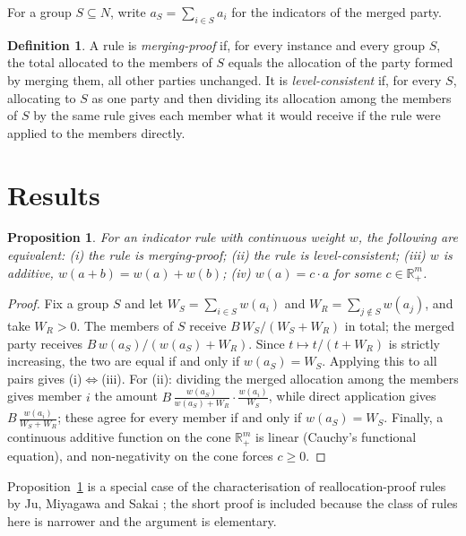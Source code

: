 \documentclass[11pt]{article}
\newtheorem{proposition}{Proposition}
\theoremstyle{definition}
\newtheorem{definition}{Definition}
\theoremstyle{remark}
\begin{document}
For a group $S\subseteq N$, write $a_S=\sum_{i\in S}a_i$ for the indicators of the merged party.

\begin{definition}
A rule is \emph{merging-proof} if, for every instance and every group $S$, the total allocated to the members of $S$ equals the allocation of the party formed by merging them, all other parties unchanged. It is \emph{level-consistent} if, for every $S$, allocating to $S$ as one party and then dividing its allocation among the members of $S$ by the same rule gives each member what it would receive if the rule were applied to the members directly.
\end{definition}

\section{Results}\label{sec:results}

\begin{proposition}\label{prop:linear}
For an indicator rule with continuous weight $w$, the following are equivalent: (i) the rule is merging-proof; (ii) the rule is level-consistent; (iii) $w$ is additive, $w(a+b)=w(a)+w(b)$; (iv) $w(a)=c\cdot a$ for some $c\in\mathbb{R}^m_{+}$.
\end{proposition}

\begin{proof}
Fix a group $S$ and let $W_S=\sum_{i\in S}w(a_i)$ and $W_R=\sum_{j\notin S}w(a_j)$, and take $W_R>0$. The members of $S$ receive $B\,W_S/(W_S+W_R)$ in total; the merged party receives $B\,w(a_S)/(w(a_S)+W_R)$. Since $t\mapsto t/(t+W_R)$ is strictly increasing, the two are equal if and only if $w(a_S)=W_S$. Applying this to all pairs gives (i)$\Leftrightarrow$(iii). For (ii): dividing the merged allocation among the members gives member $i$ the amount $B\,\frac{w(a_S)}{w(a_S)+W_R}\cdot\frac{w(a_i)}{W_S}$, while direct application gives $B\,\frac{w(a_i)}{W_S+W_R}$; these agree for every member if and only if $w(a_S)=W_S$. Finally, a continuous additive function on the cone $\mathbb{R}^m_{+}$ is linear (Cauchy's functional equation), and non-negativity on the cone forces $c\ge 0$.
\end{proof}

Proposition~\ref{prop:linear} is a special case of the characterisation of reallocation-proof rules by Ju, Miyagawa and Sakai \cite{jms}; the short proof is included because the class of rules here is narrower and the argument is elementary.
\end{document}
